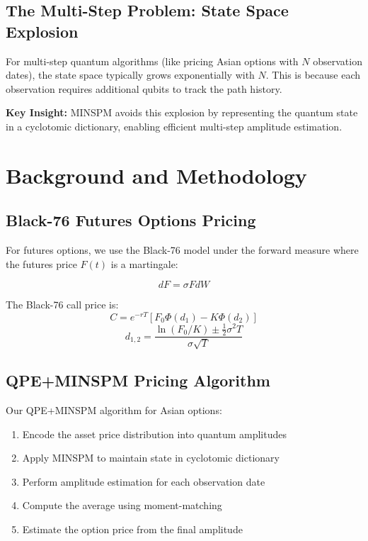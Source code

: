 \documentclass[12pt]{article}
\begin{document}
\subsection{The Multi-Step Problem: State Space Explosion}

For multi-step quantum algorithms (like pricing Asian options with $N$ observation dates), the state space typically grows exponentially with $N$. This is because each observation requires additional qubits to track the path history.

\textbf{Key Insight:} MINSPM avoids this explosion by representing the quantum state in a cyclotomic dictionary, enabling efficient multi-step amplitude estimation.

\section{Background and Methodology}

\subsection{Black-76 Futures Options Pricing}

For futures options, we use the Black-76 model under the forward measure where the futures price $F(t)$ is a martingale:

\begin{equation}
    dF = \sigma F dW
\end{equation}

The Black-76 call price is:
\begin{equation}
    C = e^{-rT} \left[F_0 \Phi(d_1) - K \Phi(d_2)\right]
\end{equation}
\begin{equation}
    d_{1,2} = \frac{\ln(F_0/K) \pm \frac{1}{2}\sigma^2 T}{\sigma \sqrt{T}}
\end{equation}

\subsection{QPE+MINSPM Pricing Algorithm}

Our QPE+MINSPM algorithm for Asian options:

\begin{enumerate}
    \item Encode the asset price distribution into quantum amplitudes
    \item Apply MINSPM to maintain state in cyclotomic dictionary
    \item Perform amplitude estimation for each observation date
    \item Compute the average using moment-matching
    \item Estimate the option price from the final amplitude
\end{enumerate}
\end{document}
